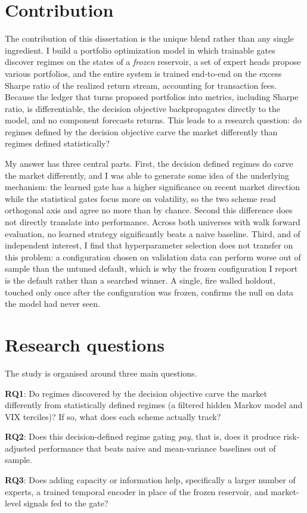 \section{Contribution}
\label{sec:contribution}

The contribution of this dissertation is the unique blend rather than any single ingredient. I build a portfolio optimization model in which trainable gates discover regimes on the states of a \emph{frozen} reservoir, a set of expert heads propose various portfolios, and the entire system is trained end-to-end on the excess Sharpe ratio of the realized return stream, accounting for transaction fees. Because the ledger that turns proposed portfolios into metrics, including Sharpe ratio, is differentiable, the decision objective backpropagates directly to the model, and no component forecasts returns. This leads to a research question: do regimes defined by the decision objective carve the market differently than regimes defined statistically?

My answer has three central parts. First, the decision defined regimes do carve the market differently, and I was able to generate some idea of the underlying mechanism: the learned gate has a higher significance on recent market direction while the statistical gates focus more on volatility, so the two scheme read orthogonal axis and agree no more than by chance. Second this difference does not directly translate into performance. Across both universes with walk forward evaluation, no learned strategy significantly beats a naive baseline. Third, and of independent interest, I find that hyperparameter selection does not transfer on this problem: a configuration chosen on validation data can perform worse out of sample than the untuned default, which is why the frozen configuration I report is the default rather than a searched winner. A single, fire walled holdout, touched only once after the configuration was frozen, confirms the null on data the model had never seen.

\section{Research questions}
\label{sec:questions}

The study is organised around three main questions.

\textbf{RQ1}: Do regimes discovered by the decision objective carve the market differently from statistically defined regimes (a filtered hidden Markov model and VIX terciles)? If so, what does each scheme actually track?

\textbf{RQ2}: Does this decision-defined regime gating \emph{pay}, that is, does it produce risk-adjusted performance that beats naive and mean-variance baselines out of sample.

\textbf{RQ3}: Does adding capacity or information help, specifically a larger number of experts, a trained temporal encoder in place of the frozen reservoir, and market-level signals fed to the gate?